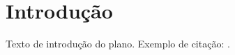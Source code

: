 \section{Introdução}
\label{sec:intro}

\begin{large}
  Texto de introdução do plano. Exemplo de citação: \cite{Babar2017}.
\end{large}
